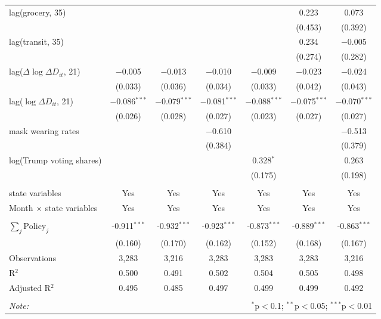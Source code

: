 \begin{tabular}{@{\extracolsep{1pt}}lcccccc}
  lag(grocery, 35) &  &  &  &  & 0.223 & 0.073 \\ 
  &  &  &  &  & (0.453) & (0.392) \\ 
  lag(transit, 35) &  &  &  &  & 0.234 & $-$0.005 \\ 
  &  &  &  &  & (0.274) & (0.282) \\ 
  lag($\Delta \log \Delta D_{it}$, 21) & $-$0.005 & $-$0.013 & $-$0.010 & $-$0.009 & $-$0.023 & $-$0.024 \\ 
  & (0.033) & (0.036) & (0.034) & (0.033) & (0.042) & (0.043) \\ 
  lag($\log \Delta D_{it}$, 21) & $-$0.086$^{***}$ & $-$0.079$^{***}$ & $-$0.081$^{***}$ & $-$0.088$^{***}$ & $-$0.075$^{***}$ & $-$0.070$^{***}$ \\ 
  & (0.026) & (0.028) & (0.027) & (0.023) & (0.027) & (0.027) \\ 
  mask wearing rates &  &  & $-$0.610 &  &  & $-$0.513 \\ 
  &  &  & (0.384) &  &  & (0.379) \\ 
  log(Trump voting shares) &  &  &  & 0.328$^{*}$ &  & 0.263 \\ 
  &  &  &  & (0.175) &  & (0.198) \\ 
 \hline \\[-1.8ex] 
state variables & Yes & Yes & Yes & Yes & Yes & Yes \\ 
Month $\times$ state variables & Yes & Yes & Yes & Yes & Yes & Yes \\ 
\hline \\[-1.8ex] 
$\sum_j \mathrm{Policy}_j$ & -0.911$^{***}$ & -0.932$^{***}$ & -0.923$^{***}$ & -0.873$^{***}$ & -0.889$^{***}$ & -0.863$^{***}$ \\ 
 & (0.160) & (0.170) & (0.162) & (0.152) & (0.168) & (0.167) \\ 
Observations & 3,283 & 3,216 & 3,283 & 3,283 & 3,283 & 3,216 \\ 
R$^{2}$ & 0.500 & 0.491 & 0.502 & 0.504 & 0.505 & 0.498 \\ 
Adjusted R$^{2}$ & 0.495 & 0.485 & 0.497 & 0.499 & 0.499 & 0.492 \\ 
\hline 
\hline \\[-1.8ex] 
\textit{Note:}  & \multicolumn{6}{r}{$^{*}$p$<$0.1; $^{**}$p$<$0.05; $^{***}$p$<$0.01} \\ 
\end{tabular} 